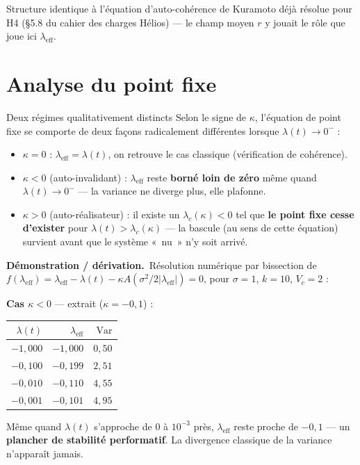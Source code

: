 \documentclass[11pt,a4paper]{article}
\newcommand{\demo}{\par\smallskip\noindent\textbf{Démonstration / dérivation.}\ }
\begin{document}
\begin{remarque}
Structure identique à l'équation d'auto-cohérence de Kuramoto déjà
résolue pour H4 (§5.8 du cahier des charges Hélios) — le champ moyen
$r$ y jouait le rôle que joue ici $\lambda_{\text{eff}}$.
\end{remarque}

\section{Analyse du point fixe}

\begin{theoreme}{Deux régimes qualitativement distincts}
Selon le signe de $\kappa$, l'équation de point fixe se comporte de deux
façons radicalement différentes lorsque $\lambda(t)\to0^-$ :
\begin{itemize}[leftmargin=1.4em]
\item $\kappa=0$ : $\lambda_{\text{eff}}=\lambda(t)$, on retrouve le cas
  classique (vérification de cohérence).
\item $\kappa<0$ (auto-invalidant) : $\lambda_{\text{eff}}$ reste
  \textbf{borné loin de zéro} même quand $\lambda(t)\to0^-$ — la
  variance ne diverge plus, elle plafonne.
\item $\kappa>0$ (auto-réalisateur) : il existe un $\lambda_c(\kappa)<0$
  tel que \textbf{le point fixe cesse d'exister} pour
  $\lambda(t)>\lambda_c(\kappa)$ — la bascule (au sens de cette
  équation) survient avant que le système «~nu~» n'y soit arrivé.
\end{itemize}
\end{theoreme}

\demo Résolution numérique par bissection de
$f(\lambda_{\text{eff}}) = \lambda_{\text{eff}} - \lambda(t) - \kappa A(\sigma^2/2|\lambda_{\text{eff}}|) = 0$,
pour $\sigma=1$, $k=10$, $V_c=2$ :

\textbf{Cas $\kappa<0$} — extrait ($\kappa=-0{,}1$) :
\begin{center}
\begin{tabular}{@{}rrr@{}}
\toprule
$\lambda(t)$ & $\lambda_{\text{eff}}$ & $\text{Var}$ \\
\midrule
$-1{,}000$ & $-1{,}000$ & $0{,}50$ \\
$-0{,}100$ & $-0{,}199$ & $2{,}51$ \\
$-0{,}010$ & $-0{,}110$ & $4{,}55$ \\
$-0{,}001$ & $-0{,}101$ & $4{,}95$ \\
\bottomrule
\end{tabular}
\end{center}
Même quand $\lambda(t)$ s'approche de $0$ à $10^{-3}$ près,
$\lambda_{\text{eff}}$ reste proche de $-0{,}1$ — un \textbf{plancher de
stabilité performatif}. La divergence classique de la variance
n'apparaît jamais.
\end{document}
